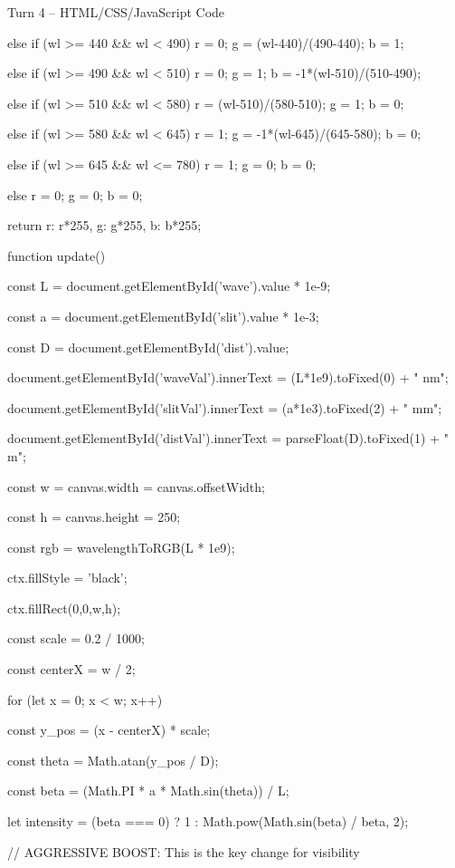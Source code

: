 \documentclass[10pt,a4paper]{article}
\begin{document}
\begin{htmlcodebox}{Turn 4 -- HTML/CSS/JavaScript Code}
{{{{{    else if (wl >= 440 && wl < 490) { r = 0; g = (wl-440)/(490-440); b = 1; }

    else if (wl >= 490 && wl < 510) { r = 0; g = 1; b = -1*(wl-510)/(510-490); }

    else if (wl >= 510 && wl < 580) { r = (wl-510)/(580-510); g = 1; b = 0; }

    else if (wl >= 580 && wl < 645) { r = 1; g = -1*(wl-645)/(645-580); b = 0; }

    else if (wl >= 645 && wl <= 780) { r = 1; g = 0; b = 0; }

    else { r = 0; g = 0; b = 0; }

    return {r: r*255, g: g*255, b: b*255};

}

function update() {

    const L = document.getElementById('wave').value * 1e-9;

    const a = document.getElementById('slit').value * 1e-3;

    const D = document.getElementById('dist').value;

    document.getElementById('waveVal').innerText = (L*1e9).toFixed(0) + " nm";

    document.getElementById('slitVal').innerText = (a*1e3).toFixed(2) + " mm";

    document.getElementById('distVal').innerText = parseFloat(D).toFixed(1) + " m";

    const w = canvas.width = canvas.offsetWidth;

    const h = canvas.height = 250;

    const rgb = wavelengthToRGB(L * 1e9);

    ctx.fillStyle = 'black';

    ctx.fillRect(0,0,w,h);

    const scale = 0.2 / 1000;

    const centerX = w / 2;

    for (let x = 0; x < w; x++) {

        const y_pos = (x - centerX) * scale;

        const theta = Math.atan(y_pos / D);

        const beta = (Math.PI * a * Math.sin(theta)) / L;

        let intensity = (beta === 0) ? 1 : Math.pow(Math.sin(beta) / beta, 2);

        // AGGRESSIVE BOOST: This is the key change for visibility

}}}}}}
\end{htmlcodebox}
\end{document}

